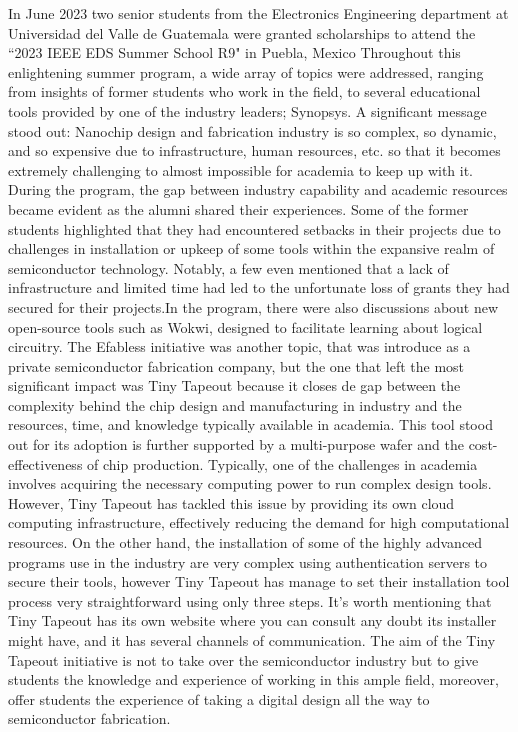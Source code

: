 In June 2023 two senior students from the Electronics Engineering department at Universidad del Valle de Guatemala were granted scholarships 
to attend the ``2023 IEEE EDS Summer School R9" in Puebla, Mexico Throughout this enlightening summer program, a wide array of topics were 
addressed, ranging from insights of former students who work in the field, to several educational tools provided by one of the industry leaders; 
Synopsys. A significant message stood out: Nanochip design and fabrication industry is so complex, so dynamic, and so expensive due to infrastructure, 
human resources, etc. so that it becomes extremely challenging to almost impossible for academia to keep up with it.
During the program, the gap between industry capability and academic resources became evident as the alumni shared their experiences. 
Some of the former students highlighted that they had encountered setbacks in their projects due to challenges in installation or upkeep of some 
tools within the expansive realm of semiconductor technology. Notably, a few even mentioned that a lack of infrastructure and limited time had led to the 
unfortunate loss of grants they had secured for their projects.In the program, there were also discussions about new open-source tools such as Wokwi, 
designed to facilitate learning about logical circuitry. The Efabless initiative was another topic, that was introduce as a private semiconductor fabrication 
company, but the one that left the most significant impact was Tiny Tapeout because it closes de gap between the complexity behind the chip design and manufacturing 
in industry and the resources, time, and knowledge typically available in academia. This tool stood out for its adoption is further supported by a multi-purpose wafer 
and the cost-effectiveness of chip production. Typically, one of the challenges in academia involves acquiring the necessary computing power to run complex design tools. 
However, Tiny Tapeout has tackled this issue by providing its own cloud computing infrastructure, effectively reducing the demand for high computational resources. On 
the other hand, the installation of some of the highly advanced programs use in the industry are very complex using authentication servers to secure their tools, 
however Tiny Tapeout has manage to set their installation tool process very straightforward using only three steps. It’s worth mentioning that Tiny Tapeout has its 
own website where you can consult any doubt its installer might have, and it has several channels of communication. The aim of the Tiny Tapeout initiative is not 
to take over the semiconductor industry but to give students the knowledge and experience of working in this ample field, moreover, offer students the experience of taking a digital design all the way to semiconductor fabrication.
